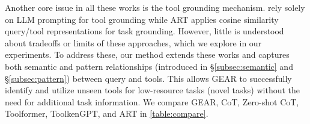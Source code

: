 \documentclass[11pt]{article}
\newcommand{\yiningchange}[2]{{\color{ForestGreen}{\st{#1}}{#2}}}
\newcommand{\name}{{\fontfamily{cmss}\selectfont GEAR}}
\begin{document}
Another core issue in all these works is the tool grounding mechanism. \citet{lu2023chameleon, qian2023creator}  rely solely on LLM prompting for tool grounding while ART applies cosine similarity query/tool representations for task grounding. However, little is understood about tradeoffs or limits of these approaches, which we explore in our experiments. To address these, our method extends these works and captures both semantic and pattern relationships (introduced in \S\ref{subsec:semantic} and \S\ref{subsec:pattern}) between query and tools.
This allows \name{} to successfully identify and utilize unseen tools for low-resource tasks (novel tasks) without the need for additional task information.
We compare \name, CoT, Zero-shot CoT, Toolformer, ToolkenGPT, and ART in \autoref{table:compare}. 
\end{document}
